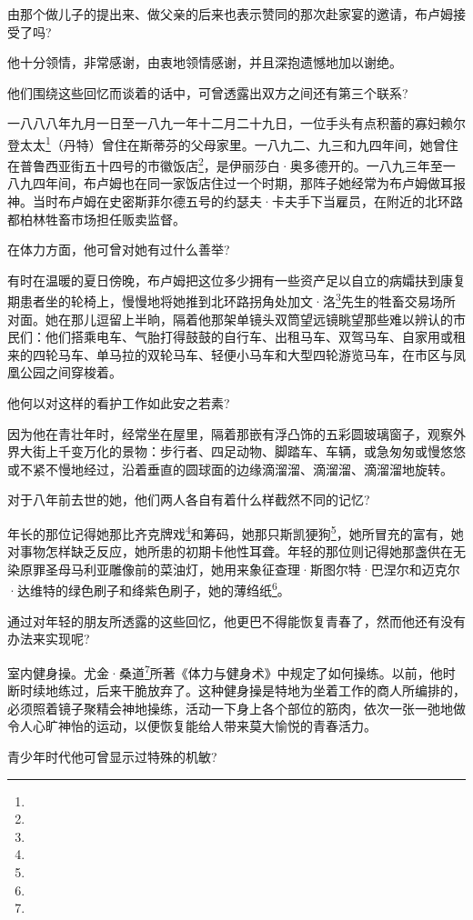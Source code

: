 \par 由那个做儿子的提出来、做父亲的后来也表示赞同的那次赴家宴的邀请，布卢姆接受了吗?
\par 他十分领情，非常感谢，由衷地领情感谢，并且深抱遗憾地加以谢绝。
\par 他们围绕这些回忆而谈着的话中，可曾透露出双方之间还有第三个联系?
\par 一八八八年九月一日至一八九一年十二月二十九日，一位手头有点积蓄的寡妇赖尔登太太\footnote{}（丹特）曾住在斯蒂芬的父母家里。一八九二、九三和九四年间，她曾住在普鲁西亚街五十四号的市徽饭店\footnote{}，是伊丽莎白·奥多德开的。一八九三年至一八九四年间，布卢姆也在同一家饭店住过一个时期，那阵子她经常为布卢姆做耳报神。当时布卢姆在史密斯菲尔德五号的约瑟夫·卡夫手下当雇员，在附近的北环路都柏林牲畜市场担任贩卖监督。
\par 在体力方面，他可曾对她有过什么善举?
\par 有时在温暖的夏日傍晚，布卢姆把这位多少拥有一些资产足以自立的病孀扶到康复期患者坐的轮椅上，慢慢地将她推到北环路拐角处加文·洛\footnote{}先生的牲畜交易场所对面。她在那儿逗留上半晌，隔着他那架单镜头双筒望远镜眺望那些难以辨认的市民们：他们搭乘电车、气胎打得鼓鼓的自行车、出租马车、双驾马车、自家用或租来的四轮马车、单马拉的双轮马车、轻便小马车和大型四轮游览马车，在市区与凤凰公园之间穿梭着。
\par 他何以对这样的看护工作如此安之若素?
\par 因为他在青壮年时，经常坐在屋里，隔着那嵌有浮凸饰的五彩圆玻璃窗子，观察外界大街上千变万化的景物：步行者、四足动物、脚踏车、车辆，或急匆匆或慢悠悠或不紧不慢地经过，沿着垂直的圆球面的边缘滴溜溜、滴溜溜、滴溜溜地旋转。
\par 对于八年前去世的她，他们两人各自有着什么样截然不同的记忆?
\par 年长的那位记得她那比齐克牌戏\footnote{}和筹码，她那只斯凯㹴狗\footnote{}，她所冒充的富有，她对事物怎样缺乏反应，她所患的初期卡他性耳聋。年轻的那位则记得她那盏供在无染原罪圣母马利亚雕像前的菜油灯，她用来象征查理·斯图尔特·巴涅尔和迈克尔·达维特的绿色刷子和绛紫色刷子，她的薄绉纸\footnote{}。
\par 通过对年轻的朋友所透露的这些回忆，他更巴不得能恢复青春了，然而他还有没有办法来实现呢?
\par 室内健身操。尤金·桑道\footnote{}所著《体力与健身术》中规定了如何操练。以前，他时断时续地练过，后来干脆放弃了。这种健身操是特地为坐着工作的商人所编排的，必须照着镜子聚精会神地操练，活动一下身上各个部位的筋肉，依次一张一弛地做令人心旷神怡的运动，以便恢复能给人带来莫大愉悦的青春活力。
\par 青少年时代他可曾显示过特殊的机敏?
